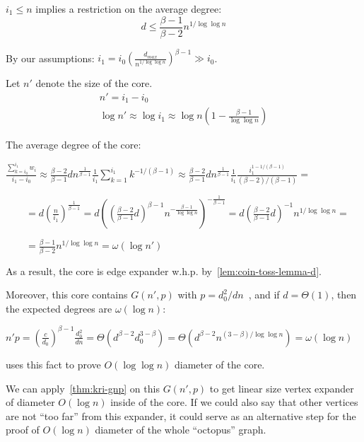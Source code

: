 $i_1\leq n$ implies a restriction on the average degree:
\begin{equation}
    d\leq\frac{\beta-1}{\beta-2}n^{1/\log\log n}
\end{equation}

By our assumptions: $i_1=i_0\left(\frac{d_{max}}{n^{1/\log\log n}}\right)^{\beta-1}\gg i_0$.

Let $n'$ denote the size of the core.
\begin{gather}
    n'=i_1-i_0\\
    \log n'\approx\log i_1\approx\log n\left(1-\frac{\beta-1}{\log\log n}\right)
\end{gather}

The average degree of the core:

$\frac{\sum_{k=i_0}^{i_1}{w_i}}{i_1-i_0}
\approx\frac{\beta-2}{\beta-1}dn^{\frac{1}{\beta-1}}\frac{1}{i_1}
\sum_{k=1}^{i_1}{k^{-1/(\beta-1)}}
\approx\frac{\beta-2}{\beta-1}dn^{\frac{1}{\beta-1}}\frac{1}{i_1}
\frac{i_1^{1-1/(\beta-1)}}{(\beta-2)/(\beta-1)}=$

$\qquad=d\left(\frac{n}{i_1}\right)^{\frac{1}{\beta-1}}
=d\left(\left(\frac{\beta-2}{\beta-1}d\right)^{\beta-1}n^{-\frac{\beta-1}{\log\log n}}\right)^{-\frac{1}{\beta-1}}
=d\left(\frac{\beta-2}{\beta-1}d\right)^{-1}n^{1/\log\log n}=$

$\qquad=\frac{\beta-1}{\beta-2}n^{1/\log\log n}=\omega(\log n')$

As a result, the core is edge expander w.h.p. by~\autoref{lem:coin-toss-lemma-d}.

Moreover, this core contains $G(n',p)$ with $p=d_0^2/dn$~\cite{cl04},
and if $d=\Theta(1)$, then the expected degrees are $\omega(\log n)$:

$n'p=\left(\frac{c}{d_0}\right)^{\beta-1}\frac{d_0^2}{dn}
=\Theta\left(d^{\beta-2}d_0^{3-\beta}\right)
=\Theta\left(d^{\beta-2}n^{(3-\beta)/\log\log n}\right)
=\omega(\log n)$

\cite{cl04} uses this fact to prove $O(\log\log n)$ diameter of the core.

We can apply~\autoref{thm:kri-gnp} on this $G(n',p)$ to get linear size
vertex expander of diameter $O(\log n)$ inside of the core.
If we could also say that other vertices are not ``too far'' from this expander,
it could serve as an alternative step for the proof
of $O(\log n)$ diameter of the whole ``octopus'' graph.

